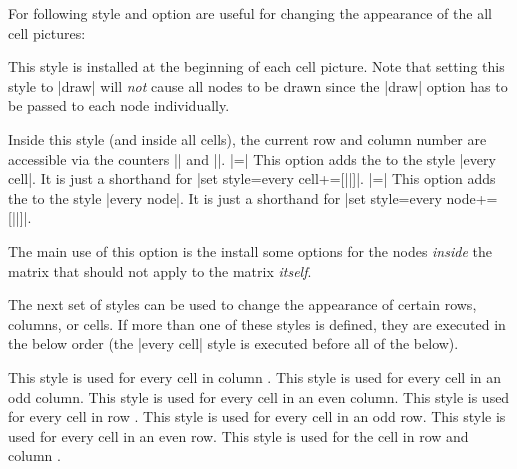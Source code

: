 For following style and option are useful for changing the appearance
of the all cell pictures:
\begin{itemize}
   This style is installed at the beginning of
  each cell picture. Note that setting this style to |draw| will
  \emph{not} cause all nodes to be drawn since the |draw| option has
  to be passed to each node individually.

  Inside this style (and inside all cells), the current row and column
  number are accessible via the counters |\pgfmatrixcurrentrow| and
  |\pgfmatrixcurrentcolumn|. 
  |=| This option adds the
   to the style |every cell|. It is just a shorthand for
  |set style={{every cell}+=[||]}|.
  |=| This option adds the
   to the style |every node|. It is just a shorthand for
  |set style={{every node}+=[||]}|.

  The main use of this option is the install some options for the
  nodes \emph{inside} the matrix that should not apply to the matrix
  \emph{itself}. 
\end{itemize}

\begin{codeexample}[]
\end{codeexample}

The next set of styles can be used to change the appearance of certain
rows, columns, or cells. If more than one of these styles is defined,
they are executed in the below order (the |every cell| style is
executed before all of the below).
\begin{itemize}
  This style is used for every cell in column .
  This style is used for every cell in an odd column.
  This style is used for every cell in an even column.
  This style is used for every cell in row .
  This style is used for every cell in an odd row.
  This style is used for every cell in an even row.
  This style is used for the cell in row  and column
  .
\end{itemize}



